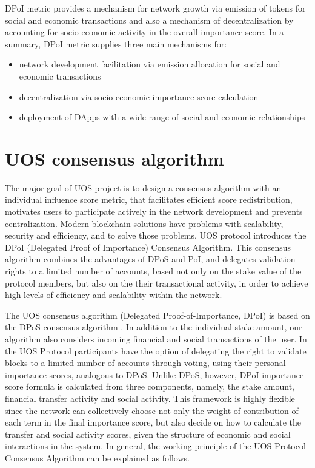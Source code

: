 \documentclass[a4paper,12pt]{article}
\begin{document}
DPoI metric provides a mechanism for network growth via emission of tokens for social and economic transactions and also a mechanism of decentralization by accounting for socio-economic activity in the overall importance score. In a summary, DPoI metric supplies three main mechanisms for:
\begin{itemize}
\item network development facilitation via emission allocation for social and economic transactions
\item decentralization via socio-economic importance score calculation
\item deployment of DApps with a wide range of social and economic relationships
\end{itemize}



\section{U{\degree}OS consensus algorithm}

The major goal of U{\degree}OS project is to design a consensus algorithm with an individual influence score metric, that facilitates efficient score redistribution, motivates users to participate actively in the network development and prevents centralization. Modern blockchain solutions have problems with scalability, security and efficiency, and to solve those problems, U{\degree}OS protocol introduces the DPoI (Delegated Proof of Importance) Consensus Algorithm. This consensus algorithm combines the advantages of DPoS and PoI, and delegates validation rights to a limited number of accounts, based not only on the stake value of the protocol members, but also on the their transactional activity, in order to achieve high levels of efficiency and scalability within the network.


The U{\degree}OS consensus algorithm (Delegated Proof-of-Importance, DPoI) is based on the DPoS consensus algorithm \cite{dantheman}. In addition to the individual stake amount, our algorithm also considers incoming financial and social transactions of the user. In the U{\degree}OS Protocol participants have the option of delegating the right to validate blocks to a limited number of accounts through voting, using their personal importance scores, analogous to DPoS. Unlike DPoS, however, DPoI importance score formula is calculated from three components, namely, the stake amount, financial transfer activity and social activity. This framework is highly flexible since the network can collectively choose not only the weight of contribution of each term in the final importance score, but also decide on how to calculate the transfer and social activity scores, given the structure of economic and social interactions in the system. In general, the working principle of the U{\degree}OS Protocol Consensus Algorithm can be explained as follows. 
\end{document}
